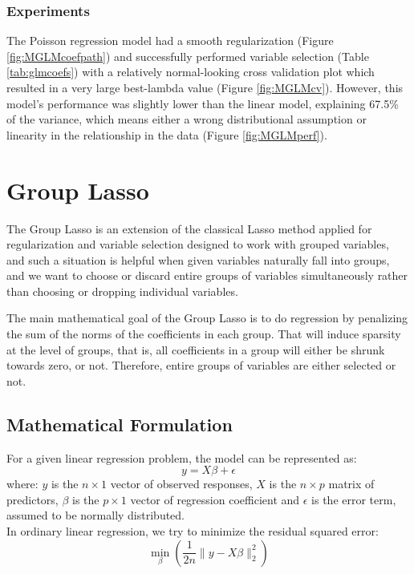 \documentclass[a4paper, 11pt]{article}
\begin{document}
\begin{multicols}{2}
{\subsubsection*{Experiments}
The Poisson regression model had a smooth regularization (Figure \ref{fig:MGLMcoefpath}) and successfully performed variable selection (Table \ref{tab:glmcoefs}) with a relatively normal-looking cross validation plot which resulted in a very large best-lambda value (Figure \ref{fig:MGLMcv}). However, this model's performance was slightly lower than the linear model, explaining 67.5\% of the variance, which means either a wrong distributional assumption or linearity in the relationship in the data (Figure \ref{fig:MGLMperf}). 


\section{Group Lasso} \vspace{-7pt}
The Group Lasso is an extension of the classical Lasso method applied for regularization and variable selection designed to work with grouped variables, and such a situation is helpful when given variables naturally fall into groups, and we want to choose or discard entire groups of variables simultaneously rather than choosing or dropping individual variables.

The main mathematical goal of the Group Lasso is to do regression by penalizing the sum of the norms of the coefficients in each group. That will induce sparsity at the level of groups, that is, all coefficients in a group will either be shrunk towards zero, or not. Therefore, entire groups of variables are either selected or not.

\subsection{Mathematical Formulation} \vspace{-3pt}
For a given linear regression problem, the model can be represented as:
\begin{equation}
y=X\beta + \epsilon
\end{equation}
where: $y$ is the $n \times 1$ vector of observed responses, $X$ is the $n \times p$ matrix of predictors, $\beta$ is the $p \times 1$ vector of regression coefficient and $\epsilon$ is the error term, assumed to be normally distributed.\\

In ordinary linear regression, we try to minimize the residual squared error: \begin{equation} \min_{\beta}\left (\frac{1}{2n}\lVert y-X\beta\rVert^{2}_{2} \right) 
\end{equation}

}
\end{multicols}
\end{document}
